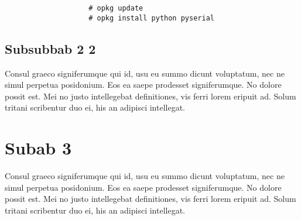 			\begingroup
			    \fontsize{10pt}{12pt}\selectfont
			    \begin{verbatim}
					# opkg update
					# opkg install python pyserial
			    \end{verbatim}  
			\endgroup			

		\subsection{Subsubbab 2 2}
			Consul graeco signiferumque qui id, usu eu summo dicunt voluptatum, nec ne simul perpetua posidonium. Eos ea saepe prodesset signiferumque. No dolore possit est. Mei no justo intellegebat definitiones, vis ferri lorem eripuit ad. Solum tritani scribentur duo ei, his an adipisci intellegat.

	\section{Subab 3}
		Consul graeco signiferumque qui id, usu eu summo dicunt voluptatum, nec ne simul perpetua posidonium. Eos ea saepe prodesset signiferumque. No dolore possit est. Mei no justo intellegebat definitiones, vis ferri lorem eripuit ad. Solum tritani scribentur duo ei, his an adipisci intellegat.
			
			
\begin{comment}

\end{comment}